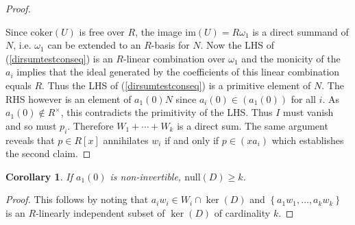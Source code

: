 \documentclass[11pt]{article}
\newtheorem{corollary}[theo]{Corollary}
\theoremstyle{definition}
\numberwithin{equation}{section}
\begin{document}
\begin{proof}
\begin{center}
\end{center}        
Since $  \mathrm{coker}(U) $ is free over $ R $, the image $ \mathrm{im}(U) = R \omega_{1}    $ is a direct summand of $ N $, i.e. $ \omega_{1} $ can be extended to an $R$-basis for $ N $. Now the LHS of (\ref{dirsumtestconseq}) is an $ R$-linear combination over $  \omega_{1} $ and the monicity of the $ a_{i} $ implies that the ideal generated by the coefficients of this linear combination equals $ R $. 
Thus the LHS of  (\ref{dirsumtestconseq}) is  a primitive element of $ N $.
The RHS however is an element of $ a_1(0) N $ since $ a_{i}(0) \in ( a_{1}(0)) $ for all $ i $. As  $ a_{1}(0)   \notin R^{\times} $, this contradicts the primitivity of the LHS.  Thus $ I $ must vanish and so must    $ p_{i} $.  Therefore $ W_{1}  + \cdots  +  W_{k }    $ is a direct sum. The same argument reveals that $ p \in R[x] $ annihilates $ w_{i}  $ if and only if $ p   \in (x a_{i} )$ which establishes the second claim. 
\end{proof}   


\begin{corollary} \label{nullityofD}     If $ a_{1}(0) $ is non-invertible, $ \mathrm{null}(D) \geq k   $.    
\end{corollary}  
\begin{proof} This follows by noting that  $  a_{i}w_{i} \in W_{i} \cap \ker(D) $ and  $  \left \{ a_{1}w_{1} , \ldots, a_{k} w_{k} \right \} $ is an $R$-linearly independent subset of $ \ker (D) $ of  cardinality $ k  $. 
\end{proof}  
\end{document}
